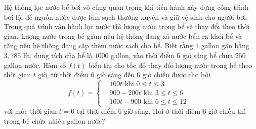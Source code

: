 \begin{bt}%
	Hệ thống lọc nước bể bơi vô cùng quan trọng khi tiến hành xây dựng công trình bơi lội để nguồn nước được làm sạch thường xuyên và giữ vệ sinh cho người bơi. Trong quá trình vận hành lọc nước thì lượng nước trong bể sẽ thay đổi theo thời gian. Lượng nước trong bể giảm nếu hệ thống đang xả nước bẩn ra khỏi bể và tăng nếu hệ thống đang cấp thêm nước sạch cho bể. Biết rằng $1$ gallon gần bằng $3{,}785$ lít, dung tích của bể là $1000$ gallon, vào thời điểm $6$ giờ sáng bể chứa $250$ gallon nước. Hàm số $f(t)$ biểu thị cho tốc độ thay đổi lượng nước trong bể theo thời gian $t$ giờ, từ thời điểm $6$ giờ sáng đến $6$ giờ chiều được cho bởi $$f(t)=\left\{\begin{aligned}
	&100t \text{ khi }0\le t\le 3\\ &900-200t \text{ khi }3\le  t\le 6\\ &100t-900 \text{ khi }6\le t\le 12
\end{aligned}
\right.$$ với  mốc thời gian $t=0$ tại thời điểm $6$ giờ sáng. Hỏi ở thời điểm $6$ giờ chiều thì trong bể chứa nhiêu gallon nước?
\end{bt}

